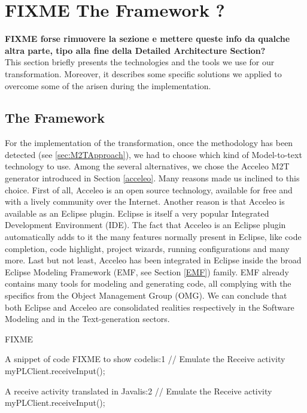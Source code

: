 \section{FIXME The Framework ? }
\label{sec:TheFramework}
\textbf{FIXME forse rimuovere la sezione e mettere queste info da qualche altra parte, tipo alla fine della Detailed Architecture Section?} \\
This section briefly presents the technologies and the tools we use for our transformation. Moreover, it describes some specific solutions we applied to overcome some of the arisen during the implementation.

\subsection{The Framework}
\label{framework}
For the implementation of the transformation, once the methodology has been detected (see \ref{sec:M2TApproach}), we had to choose which kind of Model-to-text technology to use. Among the several alternatives, we chose the Acceleo M2T generator introduced in Section \ref{acceleo}.
Many reasons made us inclined to this choice. 
First of all, Acceleo is an open source technology, available for free and with a lively community over the Internet. Another reason is that Acceleo is available as an Eclipse plugin. Eclipse is itself a very popular Integrated Development Environment (IDE). The fact that Acceleo is an Eclipse plugin automatically adds to it the many features normally present in Eclipse, like code completion, code highlight, project wizards, running configurations and many more. 
Last but not least, Acceleo has been integrated in Eclipse inside the broad Eclipse Modeling Framework (EMF, see Section \ref{EMF}) family. EMF already contains many tools for modeling and generating code, all complying with the specifics from the Object Management Group (OMG).
We can conclude that both Eclipse and Acceleo are consolidated realities respectively in the Software Modeling and in the Text-generation sectors. 


FIXME
\begin{center}
\begin{minipage}{.5\textwidth}
  \begin{java-code}{A snippet of code FIXME to show code}{lis:1}
// Emulate the Receive activity		
		myPLClient.receiveInput();	
\end{java-code}
\end{minipage}
\hfill
\begin{minipage}{.49\textwidth}
  \begin{java-code}{A receive activity translated in Java}{lis:2}
// Emulate the Receive activity		
		myPLClient.receiveInput();	
\end{java-code}
\end{minipage}
\end{center}

